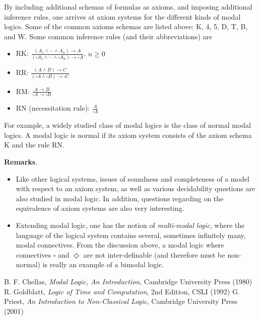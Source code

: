 \documentclass[12pt]{article}
\begin{document}
By including additional schemas of formulas as axioms, and imposing additional inference rules, one arrives at axiom systems for the different kinds of modal logics.  Some of the common axioms schemas are listed above: K, 4, 5, D, T, B, and W.  Some common inference rules (and their abbreviations) are
\begin{multicols}{2}{
\begin{itemize}
\item RK: $\displaystyle{\frac{(A_1 \wedge \cdots \wedge A_n) \to A}{(\square A_1 \wedge \cdots \wedge \square A_n)\to \square A}}$, $n\ge 0$
\item RR: $\displaystyle{\frac{(A \wedge B) \to C}{(\square A \wedge \square B)\to \square C}}$
\item RM: $\displaystyle{\frac{A \to B}{\square A \to \square B}}$
\item RN (necessitation rule): $\displaystyle{\frac{A}{\square A}}$
\end{itemize}
}
\end{multicols}
For example, a widely studied class of modal logics is the class of normal modal logics.  A modal logic is normal if its axiom system consists of the axiom schema K and the rule RN.  

\textbf{Remarks}.
\begin{itemize}
\item Like other logical systems, issues of soundness and completeness of a model with respect to an axiom system, as well as various decidability questions are also studied in modal logic.  In addition, questions regarding on the equivalence of axiom systems are also very interesting.
\item Extending modal logic, one has the notion of \emph{multi-modal logic}, where the language of the logical system contains several, sometimes infinitely many, modal connectives.  From the discussion above, a modal logic where connectives $\square$ and $\Diamond$ are not inter-definable (and therefore must be non-normal) is really an example of a bimodal logic.
\end{itemize}

\begin{thebibliography}{6}
 B. F. Chellas, {\it Modal Logic, An Introduction}, Cambridge University Press (1980)
 R. Goldblatt, {\it Logic of Time and Computation}, 2nd Edition, CSLI (1992)
 G. Priest, {\it An Introduction to Non-Classical Logic}, Cambridge University Press (2001)
\end{thebibliography}

\end{document}
